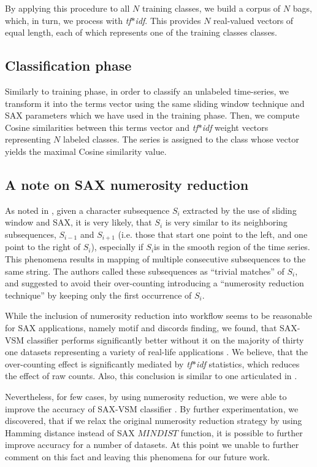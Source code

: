 \documentclass{llncs}
\begin{document}
By applying this procedure to all $N$ training classes, we build a corpus of $N$ bags, which, in
turn, we process with \textit{tf$\ast$idf}. This provides $N$ real-valued vectors of equal
length, each of which represents one of the training classes classes. 

\subsection{Classification phase}
Similarly to training phase, in order to classify an unlabeled time-series, we transform it into the
terms vector using the same sliding window technique and SAX parameters which we have used 
in the training phase. Then, we compute Cosine similarities between this terms vector and 
\textit{tf$\ast$idf} weight vectors representing $N$ labeled classes. 
The series is assigned to the class whose vector yields the maximal Cosine similarity value.

\subsection{A note on SAX numerosity reduction}
As noted in \cite{sax}, given a character subsequence $S_{i}$ extracted by the use of sliding
window and SAX, it is very likely, that $S_{i}$ is very similar to its neighboring subsequences,
$S_{i−1}$ and $S_{i+1}$ (i.e. those that start one point to the left, and one point to the right of
$S_{i}$), especially if $S_{i}$is in the smooth region of the time series. This phenomena results in
mapping of multiple consecutive subsequences to the same string. The authors called these
subsequences as ``trivial matches'' of $S_{i}$, and suggested to avoid their over-counting
introducing a ``numerosity reduction technique'' by keeping only the first occurrence of $S_{i}$. 

While the inclusion of numerosity reduction into workflow seems to be reasonable for SAX
applications, namely motif and discords finding, we found, that SAX-VSM classifier performs
significantly better without it on the majority of thirty one datasets representing a variety of 
real-life applications \cite{jmotif}. We believe, that the over-counting effect is significantly 
mediated by \textit{tf$\ast$idf} statistics, which reduces the effect of raw counts. 
Also, this conclusion is similar to one articulated in \cite{bag_patterns}.

Nevertheless, for few cases, by using numerosity reduction, we were able to improve the 
accuracy of SAX-VSM classifier \cite{jmotif}. By further experimentation, we discovered,
that if we relax the original numerosity reduction strategy by using Hamming distance 
\cite{hamming} instead of SAX $MINDIST$ \cite{streaming_sax} function, it is possible to 
further improve accuracy for a number of datasets. At this point we unable to further 
comment on this fact and leaving this phenomena for our future work.
\end{document}
